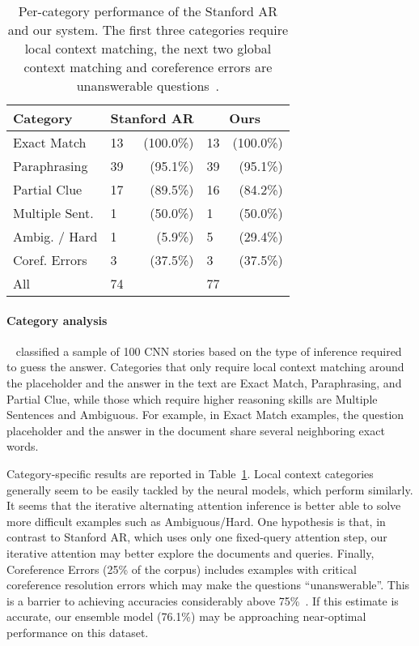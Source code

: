 \documentclass[11pt]{article}
\begin{document}
\begin{table}[t]
    \centering
    \vspace{2mm}
    \begin{tabular}{llrlr}
    \toprule
    Category & \multicolumn{2}{c}{Stanford AR} & \multicolumn{2}{c}{Ours} \\
    \midrule
    
    Exact Match        & 13 & (100.0\%) & 13 & (100.0\%) \\
    Paraphrasing       & 39 & (95.1\%)  & 39 & (95.1\%)  \\
    Partial Clue        & 17 & (89.5\%)  & 16 & (84.2\%)  \\
    \midrule
    Multiple Sent.     & 1  & (50.0\%)  & 1  & (50.0\%)  \\
    Ambig. / Hard   & 1  & (5.9\%)   & 5  & (29.4\%)   \\
    \midrule
    Coref. Errors & 3  & (37.5\%)  & 3  & (37.5\%)  \\
    \midrule
    All                & 74 &   & 77 &      \\
    \bottomrule
    \end{tabular}
    \label{tab:cnn-category}
    \caption{Per-category performance of the Stanford AR and our system. The first three categories require local context matching, the next two global context matching and coreference errors are unanswerable questions~\protect\cite{danqi}.}
\end{table}

\paragraph{Category analysis}~\cite{danqi} classified a sample of 100 CNN stories based on the type of inference required to guess the answer. Categories that only require local context matching around the placeholder and the answer in the text are Exact Match, Paraphrasing, and Partial Clue, while those which require higher reasoning skills are Multiple Sentences and Ambiguous. For example, in Exact Match examples, the question placeholder and the answer in the document share several neighboring exact words.


Category-specific results are reported in Table~\ref{tab:cnn-category}. Local context categories generally seem to be easily tackled by the neural models, which perform similarly. It seems that the iterative alternating attention inference is better able to solve more difficult examples such as Ambiguous/Hard. One hypothesis is that, in contrast to Stanford AR, which uses only one fixed-query attention step, our iterative attention may better explore the documents and queries. Finally, Coreference Errors (25\% of the corpus) includes examples with critical coreference resolution errors which may make the questions ``unanswerable''. This is a barrier to achieving accuracies considerably above 75\%~\cite{danqi}. If this estimate is accurate, our ensemble model (76.1\%) may be approaching near-optimal performance on this dataset.
\end{document}
